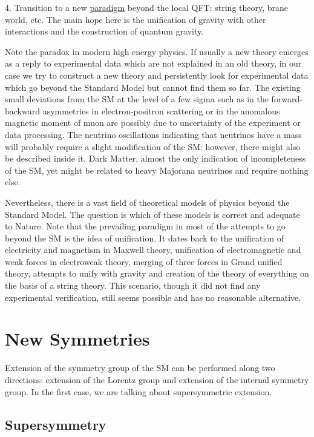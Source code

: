 \documentclass{cernyrep}
\begin{document}
4.  Transition to a new  \underline{paradigm} beyond the local QFT: string theory,  brane world, etc.
 The main hope here  is the unification of gravity with other interactions and the construction of quantum gravity.  
 
 Note the paradox in modern high energy physics. If  usually a new theory emerges as a reply to experimental data which are not explained in an old theory, in our case we try to construct a new theory and persistently look for experimental data which go beyond the Standard Model but cannot find them so far. The existing small deviations from the SM at the level of a few sigma such as in the forward-backward asymmetries  in electron-positron scattering or in the anomalous magnetic moment of muon are possibly due to uncertainty of the experiment or data processing. The neutrino oscillations indicating that neutrinos have a mass will probably require a slight modification of the SM: however, there might also be described inside it. Dark Matter, almost the only indication of incompleteness of the SM, yet might be related to heavy Majorana neutrinos and require nothing else.
 
 Nevertheless, there is a vast field of theoretical models of physics beyond the Standard Model. The question is which of these models is correct and adequate to Nature. Note that the prevailing paradigm in most of the attempts to go beyond the SM is the idea of unification. It dates back to the unification of electricity and magnetism in Maxwell theory, unification of electromagnetic and weak forces in electroweak theory, merging of three forces in Grand unified theory, attempts to unify with gravity and creation of the theory of everything on the basis of a string theory.  This scenario, though it did not find any experimental verification, still seems possible and has no reasonable alternative.
 
 \section{New Symmetries}
 Extension of the symmetry group of the SM can be performed along two directions: extension of the Lorentz group and extension of the internal symmetry group. In the first case, we are talking about supersymmetric extension.
 
 \subsection{Supersymmetry}
 
\end{document}
